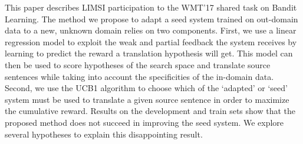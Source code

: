 This paper describes LIMSI participation to the WMT'17 shared task on Bandit Learning. The method we propose to adapt a seed system trained on out-domain data to a new, unknown domain relies on two components. First, we use a linear regression model to exploit the weak and partial feedback the system receives by learning to predict the reward a translation hypothesis will get. This model can then be used to score hypotheses of the search space and translate source sentences while taking into account the specificities of the in-domain data. Second, we use the UCB1 algorithm to choose which of the `adapted' or `seed' system must be used to translate a given source sentence in order to maximize the cumulative reward. Results on the development and train sets show that the proposed method does not succeed in improving the seed system. We explore several hypotheses to explain this disappointing result.
